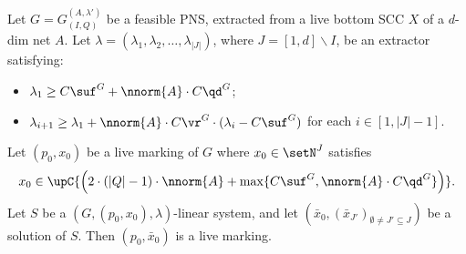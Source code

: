 \begin{lem}\label{lem:finalPNS}
	Let $G=G_{(I,Q)}^{(A,\lambda')}$ be a feasible PNS, extracted
	from a live bottom SCC $X$ of
	a $d$-dim net $A$.
Let
	$\lambda=(\lambda_1,\lambda_2,\dots,\lambda_{|J|})$,
	where $J=[1,d]\smallsetminus I$, be an extractor
	satisfying:
	\begin{itemize}
		\item
		$\lambda_1\geq
C\suf^G+\nnorm{A}\cdot C\qd^G$;
\item
	$\lambda_{i+1}\geq \lambda_1 + \nnorm{A}\cdot C\vr^{G}\cdot
			(\lambda_i-C\suf^G)$ for each
			$i\in[1,|J|{-}1]$.
	\end{itemize}
	Let $(p_0,x_0)$ be a live marking of $G$ where $x_0\in\setN^J$
	satisfies 
	\[x_0\in\upC{\left(
2\cdot(|Q|-1)\cdot\nnorm{A}+
		\max\{C\suf^G,\nnorm{A}\cdot C\qd^G\}\right)}.\]
Let $S$ be a $(G,(p_0,x_0),\lambda)$-linear system,
and let $(\bar{x}_0,(\bar{x}_{J'})_{\emptyset\neq
	J'\subseteq J})$ be a solution of $S$.
Then
 $(p_0,\bar{x}_0)$ is a live marking. 
\end{lem}	
